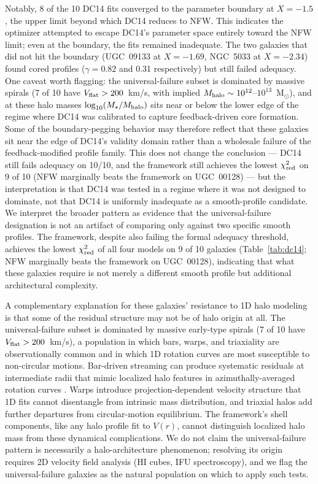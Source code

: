 Notably, 8 of the 10 DC14 fits converged to the parameter boundary at $X = -1.5$, the upper limit beyond which DC14 reduces to NFW. This indicates the optimizer attempted to escape DC14's parameter space entirely toward the NFW limit; even at the boundary, the fits remained inadequate. The two galaxies that did not hit the boundary (UGC~09133 at $X = -1.69$, NGC~5033 at $X = -2.34$) found cored profiles ($\gamma = 0.82$ and 0.31 respectively) but still failed adequacy. One caveat worth flagging: the universal-failure subset is dominated by massive spirals (7 of 10 have $V_{\rm flat} > 200$~km/s, with implied $M_{\rm halo} \sim 10^{12}$--$10^{13}$~M$_\odot$), and at these halo masses $\log_{10}(M_\star/M_{\rm halo})$ sits near or below the lower edge of the regime where DC14 was calibrated to capture feedback-driven core formation. Some of the boundary-pegging behavior may therefore reflect that these galaxies sit near the edge of DC14's validity domain rather than a wholesale failure of the feedback-modified profile family. This does not change the conclusion --- DC14 still fails adequacy on 10/10, and the framework still achieves the lowest $\chi^2_{\rm red}$ on 9 of 10 (NFW marginally beats the framework on UGC~00128) --- but the interpretation is that DC14 was tested in a regime where it was not designed to dominate, not that DC14 is uniformly inadequate as a smooth-profile candidate. We interpret the broader pattern as evidence that the universal-failure designation is not an artifact of comparing only against two specific smooth profiles. The framework, despite also failing the formal adequacy threshold, achieves the lowest $\chi^2_{\rm red}$ of all four models on 9 of 10 galaxies (Table~\ref{tab:dc14}; NFW marginally beats the framework on UGC~00128), indicating that what these galaxies require is not merely a different smooth profile but additional architectural complexity.

A complementary explanation for these galaxies' resistance to 1D halo modeling is that some of the residual structure may not be of halo origin at all. The universal-failure subset is dominated by massive early-type spirals (7 of 10 have $V_{\rm flat} > 200$~km/s), a population in which bars, warps, and triaxiality are observationally common and in which 1D rotation curves are most susceptible to non-circular motions. Bar-driven streaming can produce systematic residuals at intermediate radii that mimic localized halo features in azimuthally-averaged rotation curves \citep[e.g.,][]{SellwoodWilkinson1993,Sellwood2014}. Warps introduce projection-dependent velocity structure that 1D fits cannot disentangle from intrinsic mass distribution, and triaxial halos add further departures from circular-motion equilibrium. The framework's shell components, like any halo profile fit to $V(r)$, cannot distinguish localized halo mass from these dynamical complications. We do not claim the universal-failure pattern is necessarily a halo-architecture phenomenon; resolving its origin requires 2D velocity field analysis (HI cubes, IFU spectroscopy), and we flag the universal-failure galaxies as the natural population on which to apply such tests.

